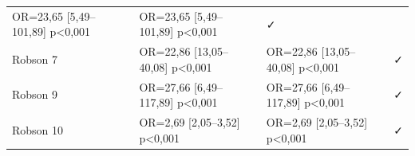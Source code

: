 \documentclass[
]{article}
\begin{document}
\begin{longtable}[]{@{}llll@{}}
\begin{minipage}[t]{0.22\columnwidth}
OR=23,65 {[}5,49--101,89{]} p\textless0,001\strut
\end{minipage} & \begin{minipage}[t]{0.22\columnwidth}\raggedright
OR=23,65 {[}5,49--101,89{]} p\textless0,001\strut
\end{minipage} & \begin{minipage}[t]{0.22\columnwidth}\raggedright
✓\strut
\end{minipage}\tabularnewline
\begin{minipage}[t]{0.22\columnwidth}\raggedright
Robson 7\strut
\end{minipage} & \begin{minipage}[t]{0.22\columnwidth}\raggedright
OR=22,86 {[}13,05--40,08{]} p\textless0,001\strut
\end{minipage} & \begin{minipage}[t]{0.22\columnwidth}\raggedright
OR=22,86 {[}13,05--40,08{]} p\textless0,001\strut
\end{minipage} & \begin{minipage}[t]{0.22\columnwidth}\raggedright
✓\strut
\end{minipage}\tabularnewline
\begin{minipage}[t]{0.22\columnwidth}\raggedright
Robson 9\strut
\end{minipage} & \begin{minipage}[t]{0.22\columnwidth}\raggedright
OR=27,66 {[}6,49--117,89{]} p\textless0,001\strut
\end{minipage} & \begin{minipage}[t]{0.22\columnwidth}\raggedright
OR=27,66 {[}6,49--117,89{]} p\textless0,001\strut
\end{minipage} & \begin{minipage}[t]{0.22\columnwidth}\raggedright
✓\strut
\end{minipage}\tabularnewline
\begin{minipage}[t]{0.22\columnwidth}\raggedright
Robson 10\strut
\end{minipage} & \begin{minipage}[t]{0.22\columnwidth}\raggedright
OR=2,69 {[}2,05--3,52{]} p\textless0,001\strut
\end{minipage} & \begin{minipage}[t]{0.22\columnwidth}\raggedright
OR=2,69 {[}2,05--3,52{]} p\textless0,001\strut
\end{minipage} & \begin{minipage}[t]{0.22\columnwidth}\raggedright
✓\strut
\end{minipage}\tabularnewline

\end{longtable}
\end{document}
